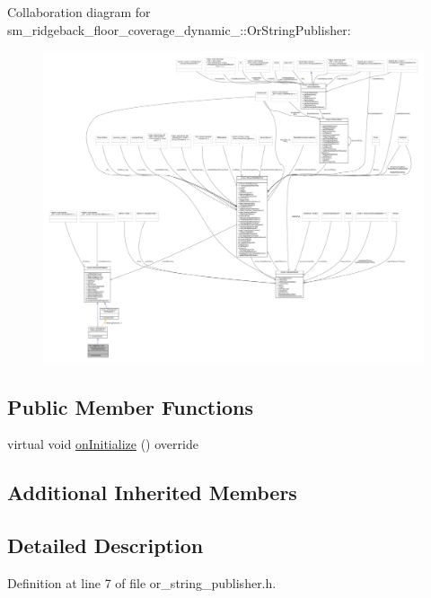 Collaboration diagram for sm\+\_\+ridgeback\+\_\+floor\+\_\+coverage\+\_\+dynamic\+\_\+:\+:Or\+String\+Publisher\+:
\nopagebreak
\begin{figure}[H]
\begin{center}
\leavevmode
\includegraphics[width=350pt]{classsm__ridgeback__floor__coverage__dynamic__1_1_1OrStringPublisher__coll__graph}
\end{center}
\end{figure}
\subsection*{Public Member Functions}
\begin{DoxyCompactItemize}
\item 
virtual void \hyperlink{classsm__ridgeback__floor__coverage__dynamic__1_1_1OrStringPublisher_ab9147f2ca673acef0f48df517bf8be39}{on\+Initialize} () override
\end{DoxyCompactItemize}
\subsection*{Additional Inherited Members}


\subsection{Detailed Description}


Definition at line 7 of file or\+\_\+string\+\_\+publisher.\+h.



